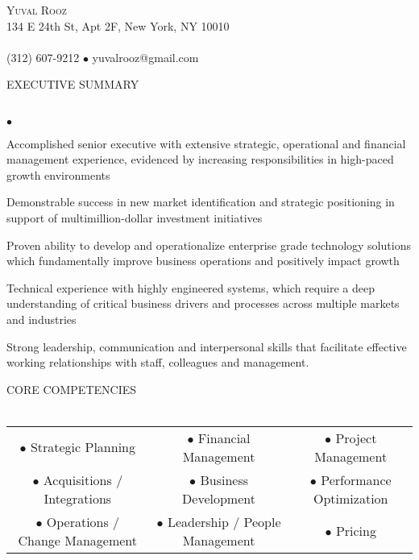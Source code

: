 \documentclass[12pt]{article}
\newcommand{\lineunder}{\vspace*{-9pt} \\ \hspace*{-18pt} \hrulefill \\}
\newcommand{\header}[1]{{\hspace*{-15pt}\vspace*{6pt} \textsc{#1}} \vspace*{-9pt} \lineunder}
\newcommand{\contact}[3]{
\vspace*{-11pt}
\begin{center}
{\LARGE \scshape {#1}}\\
#2 \lineunder
#3
\end{center}
\vspace*{-4pt}
}
\newenvironment{achievements}{\begin{list}{$\bullet$}{\topsep 0pt \itemsep -2pt}}{\vspace*{4pt}\end{list}}
\begin{document}
\small
\smallskip
\vspace*{-44pt}

\contact{\LARGE{Yuval Rooz}}
{134 E 24th St, Apt 2F, New York, NY 10010}
{(312) 607-9212 $\bullet$ yuvalrooz@gmail.com}

\header{EXECUTIVE SUMMARY}
	\begin{achievements}
  	\item Accomplished senior executive with extensive strategic, operational
          and financial management experience, evidenced by increasing
          responsibilities in high-paced growth environments
  	\item Demonstrable success in new market identification and strategic
          positioning in support of multimillion-dollar investment initiatives
    \item Proven ability to develop and operationalize enterprise grade technology
          solutions which fundamentally improve business operations and positively impact growth
    \item Technical experience with highly engineered systems, which require a
          deep understanding of critical business drivers and processes across
          multiple markets and industries
  	\item Strong leadership, communication and interpersonal skills that
          facilitate effective working relationships with staff, colleagues and management.
  \end{achievements}

\header{CORE COMPETENCIES}
\begin{center}
  \begin{tabular}{c c c}
    $\bullet$ Strategic Planning & $\bullet$ Financial Management & $\bullet$ Project Management \\
    $\bullet$ Acquisitions / Integrations & $\bullet$ Business Development & $\bullet$ Performance Optimization \\
    $\bullet$ Operations / Change Management & $\bullet$ Leadership / People Management & $\bullet$ Pricing
  \end{tabular}
\end{center}
\end{document}
